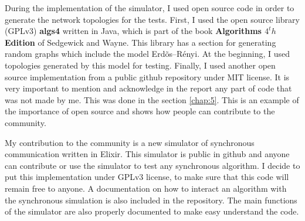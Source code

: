 During the implementation of the simulator, I used open source code in order to generate the network topologies for the tests. First, I used the open source library (GPLv3) \textbf{algs4} written in Java, which is part of the book \textbf{Algorithms $4^th$ Edition} of Sedgewick and Wayne. This library has a section for generating random graphs which include the model  Erd\~os--R\'enyi. At the beginning, I used topologies generated by this model for testing.  Finally, I used another open source implementation from a public github repository under MIT license. It is very important to mention and acknowledge in the report any part of code that was not made by me. This was done in the section \ref{chap:5}. This is an example of the importance of open source and shows how people can contribute to the community. 

My contribution to the community is a new simulator of synchronous communication written in Elixir. This simulator is public in github and anyone can contribute or use the simulator to test any synchronous algorithm. I decide to put this implementation under GPLv3 license, to make sure that this code will remain free to anyone. A documentation on how to interact an algorithm with the synchronous simulation is also included in the repository. The main functions of the simulator are also properly documented to make easy understand the code. 

